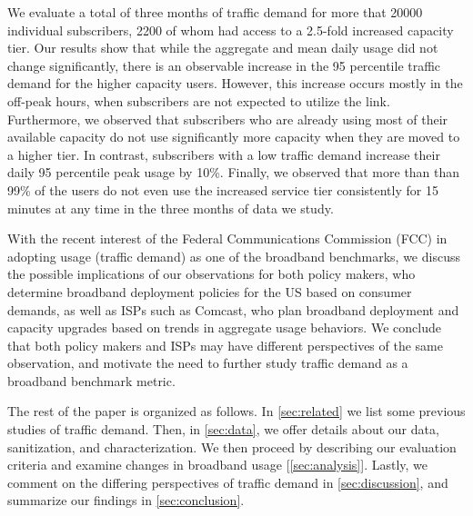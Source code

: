 We evaluate a total of three months of traffic demand for more that 20000 
individual subscribers, 2200 of whom had access to a 2.5-fold increased 
capacity tier. Our results show that while the aggregate and mean daily usage 
did not change significantly, there is an observable increase in the 95 
percentile traffic demand for the higher capacity users. However, this 
increase occurs mostly in the off-peak hours, when subscribers are not expected 
to utilize the link. 
Furthermore, we observed that subscribers who are already using most of their 
available capacity do not use significantly more capacity when they are moved 
to a higher tier. In contrast, subscribers with a low traffic demand increase 
their daily 95 percentile peak usage by 10\%. Finally, we observed that 
more than than 99\% of the users do not even use the increased service tier 
consistently for 15 minutes at any time in the three months of data we study.

With the recent interest of the Federal Communications Commission (FCC) in 
adopting usage (traffic demand) as one of the broadband benchmarks, we discuss 
the possible implications of our observations for both policy makers, who 
determine broadband deployment policies for the US based on consumer demands, as 
well as ISPs such as Comcast, who plan broadband deployment and capacity 
upgrades based on trends in aggregate usage behaviors. We conclude that both 
policy makers and ISPs may have different perspectives of the same observation, 
and motivate the need to further study traffic demand as a broadband benchmark 
metric.


The rest of the paper is organized as follows. In \autoref{sec:related} we 
list some previous studies of traffic demand. Then, in \autoref{sec:data}, 
we offer details about our data, sanitization, and characterization. We then 
proceed by describing our evaluation criteria and examine changes in broadband 
usage [\autoref{sec:analysis}].  Lastly, we comment on the differing perspectives of traffic demand 
in \autoref{sec:discussion}, and summarize our findings in 
\autoref{sec:conclusion}.
